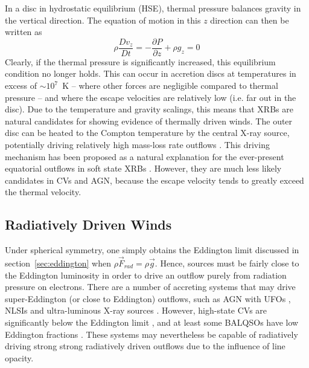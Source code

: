 In a disc in hydrostatic equilibrium (HSE), 
thermal pressure balances gravity in the vertical direction. 
The equation of motion in this $z$ direction can then be written as 
\begin{equation}
\label{eq:hse}
\rho \frac{Dv_z}{Dt} = -\frac{\partial P}{\partial z} +  \rho g_z = 0
\end{equation}
Clearly, if the thermal pressure is significantly 
increased, this equilibrium condition no longer holds. 
This can occur in accretion discs at temperatures in excess of $\sim10^7$~K --
where other forces are negligible compared to thermal pressure -- 
and where the escape velocities are relatively low (i.e. far out in the disc).
Due to the temperature and gravity scalings, this means
that XRBs are natural candidates for showing evidence of thermally driven
winds. The outer disc can be heated to the Compton temperature by 
the central X-ray source,
potentially driving relatively high mass-loss rate outflows 
\citep{begelman1983,woods1996}. 
This driving mechanism has been proposed as a natural explanation
for the ever-present equatorial outflows in soft state XRBs \citep{ponti2012}.
However, they are much less likely candidates in CVs and AGN, because
the escape velocity tends to greatly exceed the thermal velocity.

\subsection{Radiatively Driven Winds}
\label{sec:rad_winds}

Under spherical symmetry, one simply obtains the Eddington limit discussed
in section~\ref{sec:eddington} when $\rho \vec{F}_{rad} = \rho \vec{g}$. 
Hence, sources must be fairly close to the Eddington luminosity in order 
to drive an outflow purely from radiation 
pressure on electrons. There are a number of accreting systems that may drive
super-Eddington (or close to Eddington) outflows, 
such as AGN with UFOs \citep[e.g.][]{reeves2002,pounds2016},
NLSIs \citep{done2015} and ultra-luminous X-ray sources \citep[ULXs;][]{walton2013}.
However, high-state CVs are significantly below the Eddington limit 
\citep{warnerbook}, and at least some BALQSOs have low Eddington fractions 
\citep[$\sim25\%$ have $L/L_{Edd}<0.1$;][]{grupenousek2015}.
These systems may nevertheless be capable of radiatively driving strong 
strong radiatively driven outflows due to the influence of line opacity.

